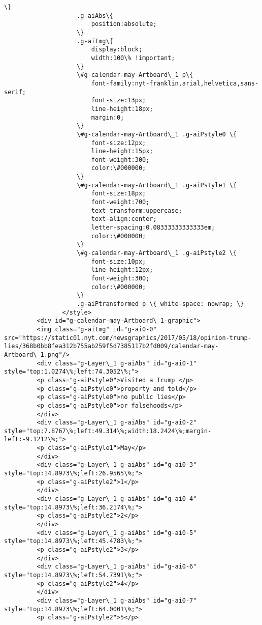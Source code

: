 \documentclass[11pt]{article}
\begin{document}
\begin{Verbatim}[commandchars=\\\{\}]
         			\}
         			.g-aiAbs\{
         				position:absolute;
         			\}
         			.g-aiImg\{
         				display:block;
         				width:100\% !important;
         			\}
         			\#g-calendar-may-Artboard\_1 p\{
         				font-family:nyt-franklin,arial,helvetica,sans-serif;
         				font-size:13px;
         				line-height:18px;
         				margin:0;
         			\}
         			\#g-calendar-may-Artboard\_1 .g-aiPstyle0 \{
         				font-size:12px;
         				line-height:15px;
         				font-weight:300;
         				color:\#000000;
         			\}
         			\#g-calendar-may-Artboard\_1 .g-aiPstyle1 \{
         				font-size:18px;
         				font-weight:700;
         				text-transform:uppercase;
         				text-align:center;
         				letter-spacing:0.08333333333333em;
         				color:\#000000;
         			\}
         			\#g-calendar-may-Artboard\_1 .g-aiPstyle2 \{
         				font-size:10px;
         				line-height:12px;
         				font-weight:300;
         				color:\#000000;
         			\}
         			.g-aiPtransformed p \{ white-space: nowrap; \}
         		</style>
         <div id="g-calendar-may-Artboard\_1-graphic">
         <img class="g-aiImg" id="g-ai0-0" src="https://static01.nyt.com/newsgraphics/2017/05/18/opinion-trump-lies/368b0bb8fea312b755ab259f5d7385117b2fd009/calendar-may-Artboard\_1.png"/>
         <div class="g-Layer\_1 g-aiAbs" id="g-ai0-1" style="top:1.0274\%;left:74.3052\%;">
         <p class="g-aiPstyle0">Visited a Trump </p>
         <p class="g-aiPstyle0">property and told</p>
         <p class="g-aiPstyle0">no public lies</p>
         <p class="g-aiPstyle0">or falsehoods</p>
         </div>
         <div class="g-Layer\_1 g-aiAbs" id="g-ai0-2" style="top:7.8767\%;left:49.314\%;width:18.2424\%;margin-left:-9.1212\%;">
         <p class="g-aiPstyle1">May</p>
         </div>
         <div class="g-Layer\_1 g-aiAbs" id="g-ai0-3" style="top:14.8973\%;left:26.9565\%;">
         <p class="g-aiPstyle2">1</p>
         </div>
         <div class="g-Layer\_1 g-aiAbs" id="g-ai0-4" style="top:14.8973\%;left:36.2174\%;">
         <p class="g-aiPstyle2">2</p>
         </div>
         <div class="g-Layer\_1 g-aiAbs" id="g-ai0-5" style="top:14.8973\%;left:45.4783\%;">
         <p class="g-aiPstyle2">3</p>
         </div>
         <div class="g-Layer\_1 g-aiAbs" id="g-ai0-6" style="top:14.8973\%;left:54.7391\%;">
         <p class="g-aiPstyle2">4</p>
         </div>
         <div class="g-Layer\_1 g-aiAbs" id="g-ai0-7" style="top:14.8973\%;left:64.0001\%;">
         <p class="g-aiPstyle2">5</p>

\end{Verbatim}
\end{document}
